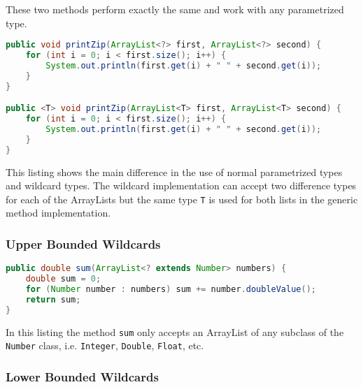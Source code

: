 \documentclass[12pt letter]{report}
\begin{document}
These two methods perform exactly the same and work with any parametrized type.

\begin{lstlisting}[language=Java]
public void printZip(ArrayList<?> first, ArrayList<?> second) {
    for (int i = 0; i < first.size(); i++) {
        System.out.println(first.get(i) + " " + second.get(i));
    }
}

public <T> void printZip(ArrayList<T> first, ArrayList<T> second) {
    for (int i = 0; i < first.size(); i++) {
        System.out.println(first.get(i) + " " + second.get(i));
    }
}
\end{lstlisting}

This listing shows the main difference in the use of normal parametrized types and wildcard types. The wildcard
implementation can accept two difference types for each of the ArrayLists but the same type \lstinline{T} is used for
both lists in the generic method implementation.

\subsubsection{Upper Bounded Wildcards}


\begin{lstlisting}[language=Java]
public double sum(ArrayList<? extends Number> numbers) {
    double sum = 0;
    for (Number number : numbers) sum += number.doubleValue();
    return sum;
}
\end{lstlisting}

In this listing the method \lstinline{sum} only accepts an ArrayList of any subclass of the \lstinline{Number} class, i.e.
\lstinline{Integer}, \lstinline{Double}, \lstinline{Float}, etc.

\subsubsection{Lower Bounded Wildcards}

\end{document}
